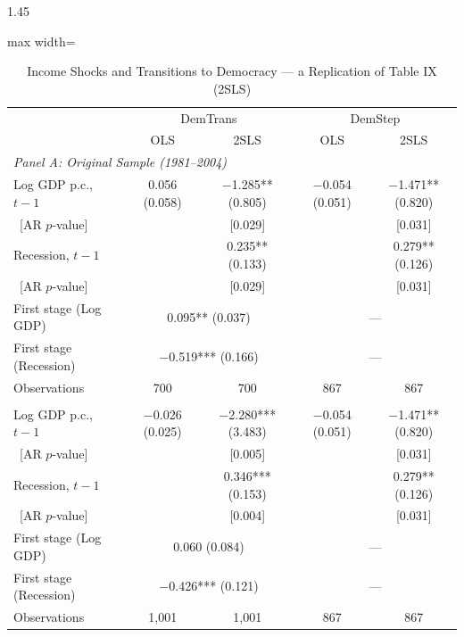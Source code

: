 \documentclass[12pt]{article}
\begin{document}
\begin{bibunit}[jpe]
\begin{spacing}{1.45}
\begin{table}[H]
\centering
\begin{adjustbox}{max width=\textwidth}
\begin{threeparttable}
\caption{Income Shocks and Transitions to Democracy --- a Replication of Table IX (2SLS)}
\label{tab:A7}
\begin{tabular}{lcccc}
\toprule
 & \multicolumn{2}{c}{DemTrans} & \multicolumn{2}{c}{DemStep\tnote{a}} \\
 & OLS & 2SLS & OLS & 2SLS \\
\midrule
\multicolumn{5}{l}{\textit{Panel A: Original Sample (1981--2004)}} \\
Log GDP p.c., $t-1$ & 0.056 (0.058) & $-$1.285** (0.805) & $-$0.054 (0.051) & $-$1.471** (0.820) \\
\ [AR $p$-value]     &               & [0.029]            &                  & [0.031] \\
Recession, $t-1$    &               & 0.235** (0.133)    &                  & 0.279** (0.126) \\
\ [AR $p$-value]     &               & [0.029]            &                  & [0.031] \\
First stage (Log GDP)   & \multicolumn{2}{c}{0.095** (0.037)}  & \multicolumn{2}{c}{---} \\
First stage (Recession) & \multicolumn{2}{c}{$-$0.519*** (0.166)} & \multicolumn{2}{c}{---} \\
Observations         & 700 & 700 & 867 & 867 \\
\addlinespace
\multicolumn{5}{l}{\textit{Panel B: Extended Sample (1981--2024)}} \\
Log GDP p.c., $t-1$ & $-$0.026 (0.025) & $-$2.280*** (3.483) & $-$0.054 (0.051) & $-$1.471** (0.820) \\
\ [AR $p$-value]     &                 & [0.005]             &                  & [0.031] \\
Recession, $t-1$    &                 & 0.346*** (0.153)    &                  & 0.279** (0.126) \\
\ [AR $p$-value]     &                 & [0.004]             &                  & [0.031] \\
First stage (Log GDP)   & \multicolumn{2}{c}{0.060 (0.084)}    & \multicolumn{2}{c}{---} \\
First stage (Recession) & \multicolumn{2}{c}{$-$0.426*** (0.121)} & \multicolumn{2}{c}{---} \\
Observations         & 1{,}001 & 1{,}001 & 867 & 867 \\

\end{tabular}
\end{threeparttable}
\end{adjustbox}
\end{table}
\end{spacing}
\end{bibunit}
\end{document}

